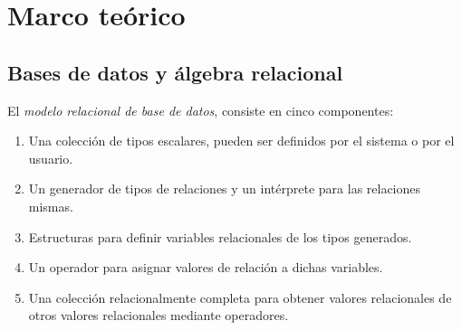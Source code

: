 \section {Marco teórico}\label{sec:marco}
\subsection {Bases de datos y álgebra relacional}\label{subsec:rdb}
El \emph{modelo relacional de base de datos}, consiste en cinco componentes:
\begin{enumerate}
	\item Una colección de tipos escalares, pueden ser definidos por el sistema o por el usuario.
	\item Un generador de tipos de relaciones y un intérprete para las relaciones mismas.
	\item Estructuras para definir variables relacionales de los tipos generados.
	\item Un operador para asignar valores de relación a dichas variables.
	\item Una colección relacionalmente completa para obtener valores relacionales de otros valores relacionales mediante operadores.
\end{enumerate}

